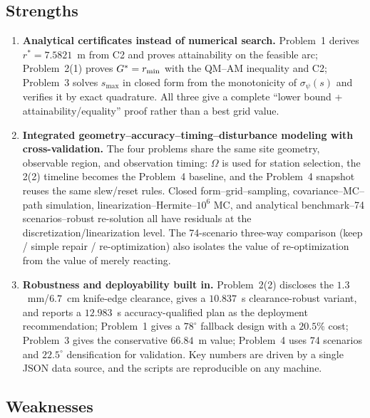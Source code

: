 \subsection{Strengths}

\begin{enumerate}[label=(\arabic*)]
\item \textbf{Analytical certificates instead of numerical search.} Problem~1 derives $r^*=7.5821$~m from C2 and proves attainability on the feasible arc; Problem~2(1) proves $G^*=r_{\min}$ with the QM--AM inequality and C2; Problem~3 solves $s_{\max}$ in closed form from the monotonicity of $\sigma_\psi(s)$ and verifies it by exact quadrature. All three give a complete ``lower bound + attainability/equality'' proof rather than a best grid value.

\item \textbf{Integrated geometry--accuracy--timing--disturbance modeling with cross-validation.} The four problems share the same site geometry, observable region, and observation timing: $\Omega$ is used for station selection, the 2(2) timeline becomes the Problem~4 baseline, and the Problem~4 snapshot reuses the same slew/reset rules. Closed form--grid--sampling, covariance--MC--path simulation, linearization--Hermite--$10^6$ MC, and analytical benchmark--74 scenarios--robust re-solution all have residuals at the discretization/linearization level. The 74-scenario three-way comparison (keep / simple repair / re-optimization) also isolates the value of re-optimization from the value of merely reacting.

\item \textbf{Robustness and deployability built in.} Problem~2(2) discloses the $1.3$~mm/$6.7$~cm knife-edge clearance, gives a $10.837$~s clearance-robust variant, and reports a $12.983$~s accuracy-qualified plan as the deployment recommendation; Problem~1 gives a $78^\circ$ fallback design with a $20.5\%$ cost; Problem~3 gives the conservative $66.84$~m value; Problem~4 uses 74 scenarios and $22.5^\circ$ densification for validation. Key numbers are driven by a single JSON data source, and the scripts are reproducible on any machine.
\end{enumerate}

\subsection{Weaknesses}

